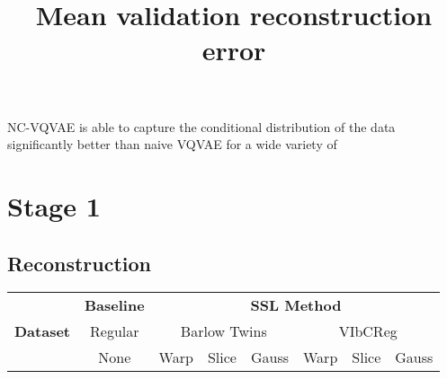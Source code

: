 \documentclass[../../thesis.tex]{subfiles}
\begin{document}
NC-VQVAE is able to capture the conditional distribution of the data significantly better than naive VQVAE for a wide variety of 

\section{Stage 1}

\subsection{Reconstruction}


\begin{table}[H]
    \centering
    \title{Mean validation reconstruction error}
    \begin{adjustbox}{width=\textwidth}
    \begin{tabular}{lc|c|c|c|c|c|c} %
        \toprule
        \multirow{3}{*}{\textbf{Dataset}} & \multicolumn{1}{c}{\textbf{Baseline}} & \multicolumn{6}{c}{\textbf{SSL Method}} \\
                                         \cmidrule(lr){3-8}
                                          & \multicolumn{1}{c}{Regular}           & \multicolumn{3}{c}{Barlow Twins}    &  \multicolumn{3}{c}{VIbCReg} \\
                                                                                   \cmidrule(lr){3-5}                    \cmidrule(lr){6-8}
                                          &   None                                & Warp  & Slice & Gauss               & Warp & Slice & Gauss \\
                            

\end{tabular}
\end{adjustbox}
\end{table}
\end{document}
